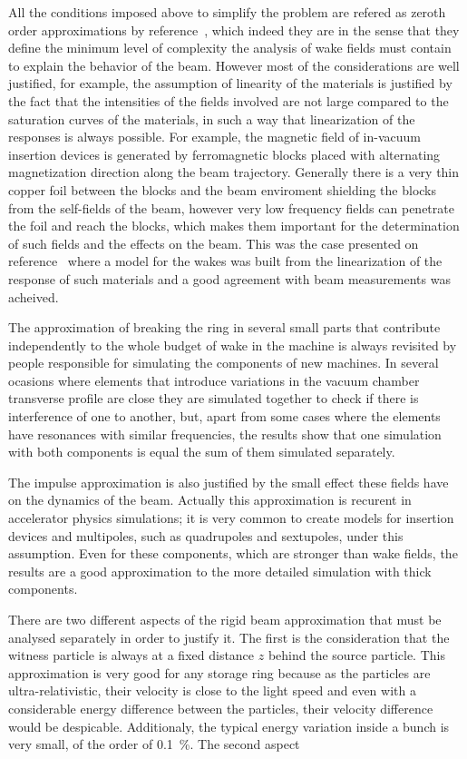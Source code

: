 \documentclass[
	12pt,				%
	openright,			%
	oneside,			%
	a4paper,		%
	chapter=TITLE,		%
	section=TITLE,		%
    brazil,				%
	english,			%
	sumario=tradicional,
	]{abntex2}
\begin{document}
  All the conditions imposed above to simplify the problem are refered as zeroth order approximations by reference~\cite{Stupakov2000a}, which indeed they are in the sense that they define the minimum level of complexity the analysis of wake fields must contain to explain the behavior of the beam. However most of the considerations are well justified, for example, the assumption of linearity of the materials is justified by the fact that the intensities of the fields involved are not large compared to the saturation curves of the materials, in such a way that linearization of the responses is always possible. For example, the magnetic field of in-vacuum insertion devices is generated by ferromagnetic blocks placed with alternating magnetization direction along the beam trajectory. Generally there is a very thin copper foil between the blocks and the beam enviroment shielding the blocks from the self-fields of the beam, however very low frequency fields can penetrate the foil and reach the blocks, which makes them important for the determination of such fields and the effects on the beam. This was the case presented on reference~\cite{Bassi} where a model for the wakes was built from the linearization of the response of such materials and a good agreement with beam measurements was acheived.

  The approximation of breaking the ring in several small parts that contribute independently to the whole budget of wake in the machine is always revisited by people responsible for simulating the components of new machines. In several ocasions where elements that introduce variations in the vacuum chamber transverse profile are close they are simulated together to check if there is interference of one to another, but, apart from some cases where the elements have resonances with similar frequencies, the results show that one simulation with both components is equal the sum of them simulated separately.

  The impulse approximation is also justified by the small effect these fields have on the dynamics of the beam. Actually this approximation is recurent in accelerator physics simulations; it is very common to create models for insertion devices and multipoles, such as quadrupoles and sextupoles, under this assumption. Even for these components, which are stronger than wake fields, the results are a good approximation to the more detailed simulation with thick components.

  There are two different aspects of the rigid beam approximation that must be analysed separately in order to justify it. The first is the consideration that the witness particle is always at a fixed distance $z$ behind the source particle. This approximation is very good for any storage ring because as the particles are ultra-relativistic, their velocity is close to the light speed and even with a considerable energy difference between the particles, their velocity difference would be despicable. Additionaly, the typical energy variation inside a bunch is very small, of the order of \SI{0.1}{\percent}. {\huge The second aspect}
\end{document}
